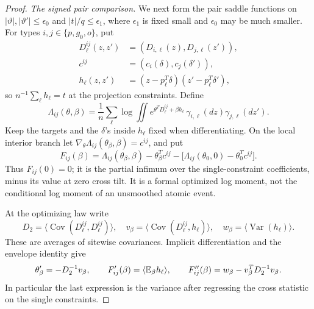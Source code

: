 \begin{proof}
\par\smallskip\noindent\textit{The signed pair comparison.}\enspace
We next form the pair saddle functions on
\(|\vartheta|,|\vartheta'|\le\epsilon_0\) and
\(|t|/q\le\epsilon_1\), where \(\epsilon_1\) is fixed small
and \(\epsilon_0\) may be much smaller. For types
\(i,j\in\{p,g_0,o\}\), put
\[
\begin{split}
 D_\ell^{ij}(z,z')&=(D_{i,\ell}(z),D_{j,\ell}(z')),\\
 c^{ij}&=(c_i(\delta),c_j(\delta')),\\
 h_\ell(z,z')&=(z-p_\ell^T\delta)(z'-p_\ell^T\delta'),
\end{split}
\]
so \(n^{-1}\sum_\ell h_\ell=t\) at the projection constraints.
Define
\[
 \Lambda_{ij}(\theta,\beta)=\frac1n\sum_\ell
 \log\iint e^{\theta^TD_\ell^{ij}+\beta h_\ell}
       \,\gamma_{i,\ell}(dz)\gamma_{j,\ell}(dz').
\]
Keep the targets and the \(\delta\)'s inside \(h_\ell\) fixed
when differentiating. On the local interior branch let
\(\nabla_\theta\Lambda_{ij}(\theta_\beta,\beta)=c^{ij}\), and put
\[
 F_{ij}(\beta)=
 \Lambda_{ij}(\theta_\beta,\beta)-\theta_\beta^Tc^{ij}
 -\bigl[\Lambda_{ij}(\theta_0,0)-\theta_0^Tc^{ij}\bigr].
\]
Thus \(F_{ij}(0)=0\); it is the partial infimum over the
single-constraint coefficients, minus its value at zero cross
tilt. It is a formal optimized log moment, not the conditional
log moment of an unsmoothed atomic event.

At the optimizing law write
\[
 D_2=\langle\operatorname{Cov}(D_\ell^{ij},D_\ell^{ij})\rangle,
 \quad v_\beta=\langle\operatorname{Cov}(D_\ell^{ij},h_\ell)\rangle,
 \quad w_\beta=\langle\operatorname{Var}(h_\ell)\rangle.
\]
These are averages of sitewise covariances. Implicit differentiation
and the envelope identity give
\[
 \theta_\beta'=-D_2^{-1}v_\beta,\qquad
 F_{ij}'(\beta)=\langle\mathbb E_\beta h_\ell\rangle,\qquad
 F_{ij}''(\beta)=w_\beta-v_\beta^TD_2^{-1}v_\beta.
\]
In particular the last expression is the variance after regressing
the cross statistic on the single constraints.


\end{proof}
